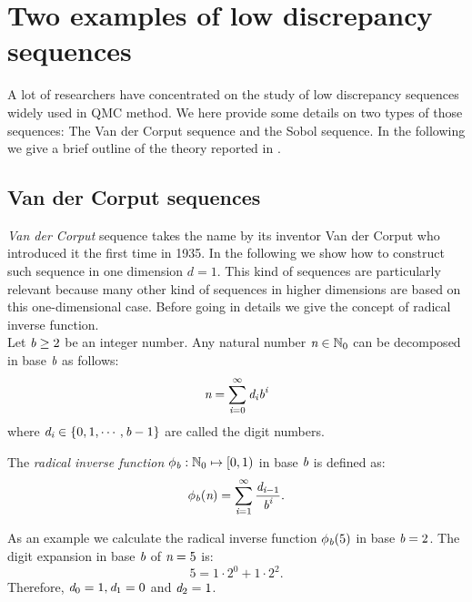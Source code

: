 \chapter{Two examples of low discrepancy sequences}\label{app:Sobol}
A lot of researchers have concentrated on the study of low discrepancy sequences widely used in QMC method. We here provide some details on two types of those sequences: The Van der Corput sequence and the Sobol sequence.
In the following we give a brief outline of the theory reported in \cite{joe2008notes, leobacher2014introduction}.
\section{Van der Corput sequences}
\textit{Van der Corput} sequence takes the name by its inventor Van der Corput who introduced it the first time in 1935. In the following we show how to construct such sequence in one dimension $d=1$. This kind of sequences are particularly relevant because many other kind of sequences in higher dimensions are based on this one-dimensional case. Before going in details we give the concept of radical inverse function. \\ \indent 
Let $\textit{b}\geq 2$ be an integer number. Any natural number $\textit{n}\in \mathbb{N}_0$ can be decomposed in base $\textit{b}$ as follows:
\begin{equation}
\textit{n} = \sum_{\textit{i}=0}^\infty \textit{d}_{\textit{i}}\textit{b}^{\textit{i}}
\end{equation}
where $\textit{d}_{\textit{i}} \in \{0, 1, \cdots, \textit{b}-1\}$ are called the digit numbers.
\begin{definition}
The \textit{radical inverse function} $\phi_{\textit{b}}:\mathbb{N}_0\mapsto [0,1)$ in base $\textit{b}$ is defined as:
\begin{equation}
\phi_{\textit{b}}(\textit{n}) = \sum_{\textit{i}=1}^{\infty}\frac{\textit{d}_{\textit{i}-1}}{\textit{b}^{\textit{i}}}.
\end{equation}
\end{definition}
As an example we calculate the radical inverse function $\phi_{\textit{b}}(5)$ in base $\textit{b} = 2$. 
The digit expansion in base $\textit{b}$ of $\textit{n}=5$ is:
\begin{equation}
5 = 1\cdot 2^0+1\cdot 2^2.
\end{equation}
Therefore, $\textit{d}_0 = 1, \textit{d}_1 = 0$ and $\textit{d}_2 = 1$. 

